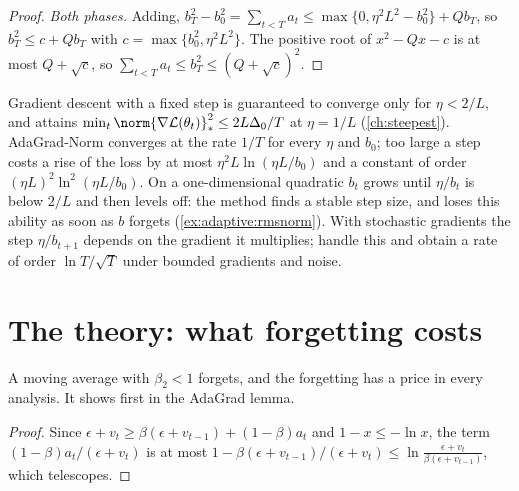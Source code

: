 \begin{refsection}
\begin{proof}
\emph{Both phases.} Adding, $b_T^2-b_0^2=\sum_{t<T}a_t\le\max\{0,\eta^2L^2-b_0^2\}+Qb_T$, so $b_T^2\le c+Qb_T$ with $c=\max\{b_0^2,\eta^2L^2\}$. The positive root of $x^2-Qx-c$ is at most $Q+\sqrt c$, so $\sum_{t<T}a_t\le b_T^2\le(Q+\sqrt c)^2$.
\end{proof}

Gradient descent with a fixed step is guaranteed to converge only for $\eta<2/L$, and attains $\min_t\norm{\nabla\Loss(\theta_t)}_*^2\le2L\Delta_0/T$ at $\eta=1/L$ (\cref{ch:steepest}). AdaGrad-Norm converges at the rate $1/T$ for every $\eta$ and $b_0$; too large a step costs a rise of the loss by at most $\eta^2L\ln(\eta L/b_0)$ and a constant of order $(\eta L)^2\ln^2(\eta L/b_0)$. On a one-dimensional quadratic $b_t$ grows until $\eta/b_t$ is below $2/L$ and then levels off: the method finds a stable step size, and loses this ability as soon as $b$ forgets (\cref{ex:adaptive:rmsnorm}). With stochastic gradients the step $\eta/b_{t+1}$ depends on the gradient it multiplies; \textcite{WardWuBottou2019} handle this and obtain a rate of order $\ln T/\sqrt T$ under bounded gradients and noise.

\section{The theory: what forgetting costs}\label{sec:adaptive:forgetting}

A moving average with $\beta_2<1$ forgets, and the forgetting has a price in every analysis. It shows first in the AdaGrad lemma.


\begin{proof}
Since $\epsilon+v_t\ge\beta(\epsilon+v_{t-1})+(1-\beta)a_t$ and $1-x\le-\ln x$, the term $(1-\beta)a_t/(\epsilon+v_t)$ is at most $1-\beta(\epsilon+v_{t-1})/(\epsilon+v_t)\le\ln\frac{\epsilon+v_t}{\beta(\epsilon+v_{t-1})}$, which telescopes.
\end{proof}


\end{refsection}
